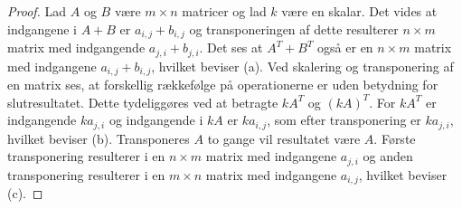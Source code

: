 \begin{proof}
Lad $A$ og $B$ være $m \times n$ matricer og lad $k$ være en skalar.
Det vides at indgangene i $A+B$ er $a_{i,j} + b_{i,j}$ og transponeringen af dette resulterer $n \times m$ matrix med indgangende $a_{j,i} + b_{j,i}$.
Det ses at  $A^T + B^T$ også er en $n \times m$ matrix med indgangene $a_{i,j} + b_{i,j}$, hvilket beviser (a).
Ved skalering og transponering af en matrix ses, at forskellig rækkefølge på operationerne er uden betydning for slutresultatet.
Dette tydeliggøres ved at betragte $kA^T$ og $(kA)^T$.
For $kA^T$ er indgangende $ka_{j,i}$ og indgangende i $kA$ er $ka_{i,j}$, som efter transponering er $ka_{j,i}$, hvilket beviser (b).
Transponeres $A$ to gange vil resultatet være $A$.
Første transponering resulterer i en $n \times m$ matrix med indgangene $a_{j,i}$ og anden transponering resulterer i en $m \times n$ matrix med indgangene $a_{i,j}$, hvilket beviser (c).
\end{proof}